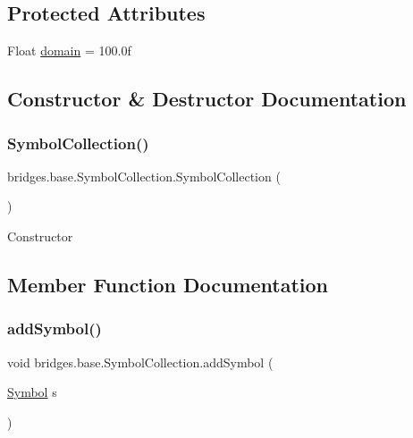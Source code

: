 \subsection*{Protected Attributes}
\begin{DoxyCompactItemize}
\item 
Float \hyperlink{classbridges_1_1base_1_1_symbol_collection_a7624e96d2a4b5b6264791eb8dacbd350}{domain} = 100.\+0f
\end{DoxyCompactItemize}


\subsection{Constructor \& Destructor Documentation}
\mbox{\label{classbridges_1_1base_1_1_symbol_collection_a8959dab963ce54f56560c6c27a3a3de5}} 
\subsubsection{\texorpdfstring{Symbol\+Collection()}{SymbolCollection()}}
{\footnotesize\ttfamily bridges.\+base.\+Symbol\+Collection.\+Symbol\+Collection (\begin{DoxyParamCaption}{ }\end{DoxyParamCaption})}

Constructor 

\subsection{Member Function Documentation}
\mbox{\label{classbridges_1_1base_1_1_symbol_collection_a8e934c53b78b05a7e982f3ff2362adea}} 
\subsubsection{\texorpdfstring{add\+Symbol()}{addSymbol()}}
{\footnotesize\ttfamily void bridges.\+base.\+Symbol\+Collection.\+add\+Symbol (\begin{DoxyParamCaption}\item[{\hyperlink{classbridges_1_1base_1_1_symbol}{Symbol}}]{s }\end{DoxyParamCaption})}

